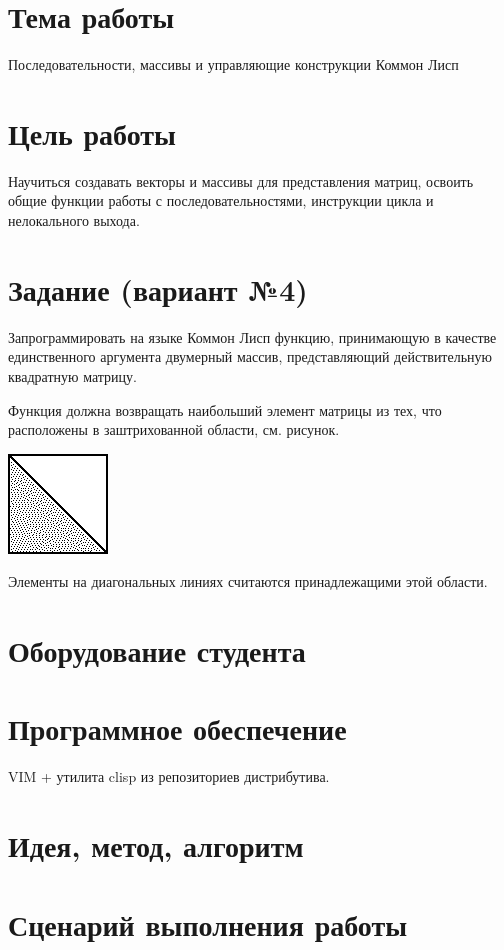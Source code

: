 \documentclass[12pt]{article}
\begin{document}

\section{Тема работы}
Последовательности, массивы и управляющие конструкции Коммон Лисп

\section{Цель работы}
Научиться создавать векторы и массивы для представления матриц,
освоить общие функции работы с последовательностями,
инструкции цикла и нелокального выхода.

\section{Задание (вариант №4)}
Запрограммировать на языке Коммон Лисп функцию, принимающую в качестве
единственного аргумента двумерный массив,
представляющий действительную квадратную матрицу.

Функция должна возвращать наибольший элемент матрицы из тех,
что расположены в заштрихованной области, см. рисунок.

\includegraphics{arrays_matrix-bl.png}

Элементы на диагональных линиях считаются принадлежащими этой области.

\section{Оборудование студента}
\mypc

\section{Программное обеспечение}
VIM + утилита clisp из репозиториев дистрибутива.

\section{Идея, метод, алгоритм}
\section{Сценарий выполнения работы}
\end{document}
